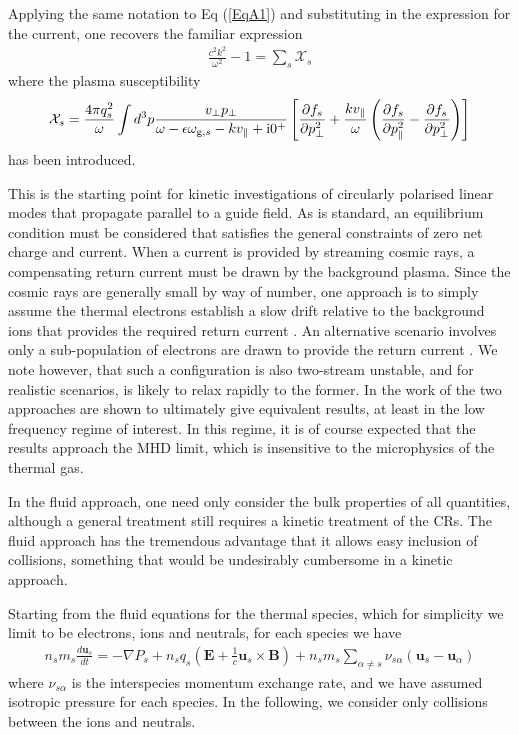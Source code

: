 \documentclass[a4paper,fleqn,usenatbib]{mnras}
\newcommand{\eqb}{\begin{eqnarray}}
\newcommand{\eqe}{\end{eqnarray}}
\begin{document}
Applying the same notation to Eq (\ref{EqA1}) and substituting in the expression for the current, one recovers the familiar expression
\eqb
\frac{c^2k^2}{\omega^2} - 1 = \sum_s \mathcal{X}_s
\eqe
where the plasma susceptibility 
\eqb
\mathcal{X}_s =  \frac{4 \pi q_s^2}{\omega} \int d^3 p
\frac{v_\bot p_\bot}{\omega  -  \epsilon \omega_{{\rm g},s} -k v_\| +{\rm i}0^+}
\left[ \frac{\partial f_s}{\partial p_\bot^2}+
\frac{ k v_\|}{\omega}\left(\frac{\partial f_s}{\partial p_\|^2}-\frac{\partial f_s}{\partial p_\bot^2}\right)
 \right] 
 \label{EqSusc1}
\eqe
has been introduced. 

This is the starting point for kinetic investigations of circularly polarised linear modes that propagate parallel to a guide field. As is standard, an equilibrium condition must be considered that satisfies the general constraints of zero net charge and current. When a current is provided by streaming cosmic rays, a compensating return current must be drawn by the background plasma. Since the cosmic rays are generally small by way of number, one approach is to simply assume the thermal electrons establish a slow drift relative to the background ions that provides the required return current \cite[e.g.][]{Achterberg83, Reville06,LuoMelrose}.  An alternative scenario involves only a sub-population of electrons are drawn to provide the return current \citep{AmatoBlasi,ZweibelEverett}.
We note however, that such a configuration is also two-stream unstable, and for realistic scenarios, is likely to relax rapidly to the former. In the work of \citet{AmatoBlasi} the two  approaches are shown to ultimately give equivalent results, at least in the low frequency regime of interest. In this regime, it is of course expected that the results approach the MHD limit, which is insensitive to  the microphysics of the thermal gas.

In the fluid approach, one need only consider the bulk properties of all quantities, although a general treatment still requires a kinetic treatment of the CRs. The fluid approach has the tremendous advantage that it allows easy inclusion of collisions, something that would be undesirably cumbersome in a kinetic approach.

Starting from the fluid equations for the thermal species, which for simplicity  we limit to be electrons, ions and neutrals, for each species we have
\eqb
n_s m_s \frac{d\bm{u}_s}{dt} = -\nabla P_s + n_s q_s\left(\bm{E} + \frac{1}{c}\bm{u}_s\times \bm{B}\right) +  n_s m_s  \sum_{\alpha\neq s} \nu_{s\alpha}(\bm{u}_s-\bm{u}_\alpha)
\eqe
where $\nu_{s\alpha}$ is the interspecies momentum exchange rate, and we have assumed isotropic pressure for each species. In the following, we consider only collisions between the ions and neutrals. 
\end{document}
